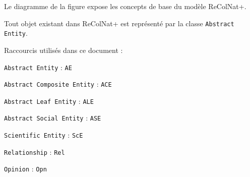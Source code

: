 \startsection[title={Éléments de modélisation}]

Le diagramme de la figure  expose les concepts de base du modèle ReColNat+.

Tout objet existant dans ReColNat+ est représenté par la classe {\tt Abstract Entity}.


Raccourcis utilisés dans ce document :

\startitemize
	\item {\tt Abstract Entity} : {\tt AE}
	\item {\tt Abstract Composite Entity} : {\tt ACE}
	\item {\tt Abstract Leaf Entity} : {\tt ALE}
	\item {\tt Abstract Social Entity} : {\tt ASE}
	\item {\tt Scientific Entity} : {\tt ScE}
	\item {\tt Relationship} : {\tt Rel}
	\item {\tt Opinion} : {\tt Opn}
\stopitemize